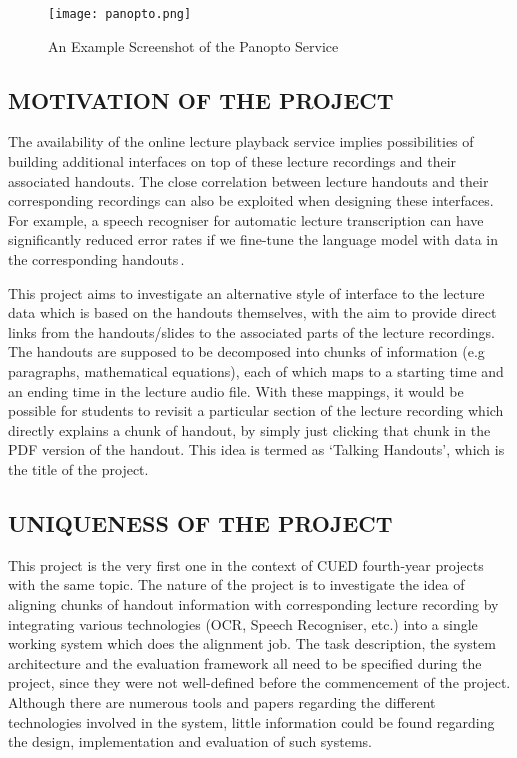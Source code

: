 \documentclass[12pt]{article}
\begin{document}
\begin{figure}[!htb]
    \centering
    \texttt{[image: panopto.png]}
    \caption{An Example Screenshot of the Panopto Service}
    \label{fig:panopto}
\end{figure}

\subsection{MOTIVATION OF THE PROJECT}

The availability of the online lecture playback service implies possibilities of building additional interfaces on top of these lecture recordings and their associated handouts. The close correlation between lecture handouts and their corresponding recordings can also be exploited when designing these interfaces. For example, a speech recogniser for automatic lecture transcription can have significantly reduced error rates if we fine-tune the language model with data in the corresponding handouts\,\cite{transslide}.

This project aims to investigate an alternative style of interface to the lecture data which is based on the handouts themselves, with the aim to provide direct links from the handouts/slides to the associated parts of the lecture recordings. The handouts are supposed to be decomposed into chunks of information (e.g paragraphs, mathematical equations), each of which maps to a starting time and an ending time in the lecture audio file. With these mappings, it would be possible for students to revisit a particular section of the lecture recording which directly explains a chunk of handout, by simply just clicking that chunk in the PDF version of the handout. This idea is termed as `Talking Handouts', which is the title of the project.

\subsection{UNIQUENESS OF THE PROJECT}

This project is the very first one in the context of CUED fourth-year projects with the same topic. The nature of the project is to investigate the idea of aligning chunks of handout information with corresponding lecture recording by integrating various technologies (OCR, Speech Recogniser, etc.) into a single working system which does the alignment job. The task description, the system architecture and the evaluation framework all need to be specified during the project, since they were not well-defined before the commencement of the project. Although there are numerous tools and papers regarding the different technologies involved in the system, little information could be found regarding the design, implementation and evaluation of such systems.
\end{document}
